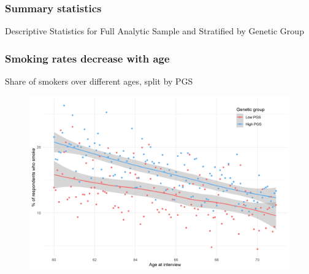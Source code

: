 \documentclass[10pt,compress,xcolor=dvipsnames,aspectratio=169]{beamer}    %
\newcounter{ex}
\newcommand{\1}[1]{\mathrm{1\hspace*{-2.5pt}l}[#1]}	%
\begin{document}
\begin{frame}
\frametitle{Summary statistics}\label{frame:sumstats}
\begin{table}[ht]
	\caption{Descriptive Statistics for Full Analytic Sample and Stratified by Genetic Group}
	\small\resizebox{1.0\textheight}{!}{
		
	}
\end{table}

\hyperlink{frame:sumstats2}{}
\hyperlink{frame:uninsured}{}

\end{frame}

\begin{frame}
\frametitle{Smoking rates decrease with age}
Share of smokers over different ages, split by PGS

\begin{figure}[hbtp]
\centering
\includegraphics[height=0.8\textheight]{../../3_output/over_time/graph_6070smokenplot_agebypgs.png}
\label{fig:}
\end{figure}

\end{frame}


%
%
\end{document}
